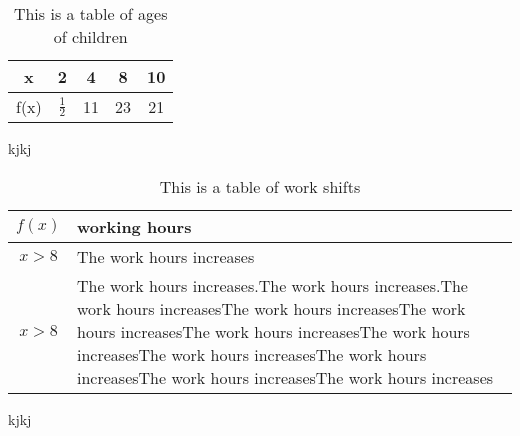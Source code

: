 \documentclass[11pt ]{article}
\begin{document}
	\vspace{1cm}
	\begin{table}[H]
		\centering
		\def\arraystretch{1.3}
	\begin{tabular}{|c|c|c|c|c|}
		\hline
		x & 2 & 4  &8 &10 \\ \hline
		f(x) & $\frac{1}{2}$  &11 &23 &21 \\ \hline
	\end{tabular}
	\caption{This is a table of ages of children}
\end{table}
	kjkj
	\\
		\vspace{1cm}
	\begin{table}[H]
		\caption{This is a table of work shifts}
		\centering
		\def\arraystretch{1.3}
		\begin{tabular}{|c|p{1.8in}|}
			\hline
			$f(x)$ & working hours  \\ \hline
			$x>8$ &The work hours increases\\ \hline
			$x>8$ &The work hours increases.The work hours increases.The work hours increasesThe work hours increasesThe work hours increasesThe work hours increasesThe work hours increasesThe work hours increasesThe work hours increasesThe work hours increasesThe work hours increases\\ \hline
			
		\end{tabular}
		
	\end{table}
	kjkj
	\\
	
	
\end{document}
